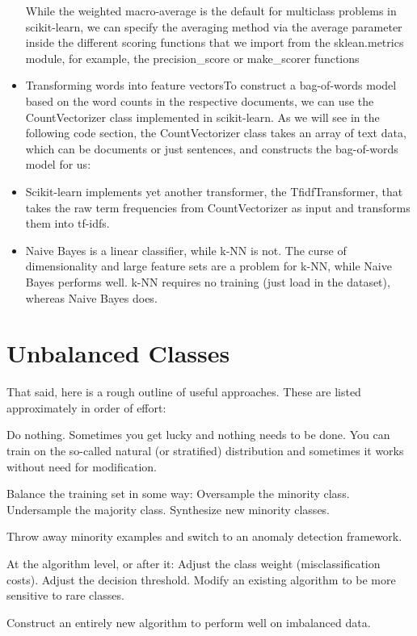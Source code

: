 \documentclass[]{book}
\theoremstyle{definition}
\theoremstyle{definition}
\theoremstyle{definition}
\theoremstyle{remark}
\begin{document}
\begin{itemize}
  While the weighted macro-average is the default for multiclass
  problems in scikit-learn, we can specify the averaging method via the
  average parameter inside the different scoring functions that we
  import from the sklean.metrics module, for example, the
  precision\_score or make\_scorer functions
\item
  Transforming words into feature vectorsTo construct a bag-of-words
  model based on the word counts in the respective documents, we can use
  the CountVectorizer class implemented in scikit-learn. As we will see
  in the following code section, the CountVectorizer class takes an
  array of text data, which can be documents or just sentences, and
  constructs the bag-of-words model for us:
\item
  Scikit-learn implements yet another transformer, the TfidfTransformer,
  that takes the raw term frequencies from CountVectorizer as input and
  transforms them into tf-idfs.
\item
  Naive Bayes is a linear classifier, while k-NN is not. The curse of
  dimensionality and large feature sets are a problem for k-NN, while
  Naive Bayes performs well. k-NN requires no training (just load in the
  dataset), whereas Naive Bayes does.
\end{itemize}

\section{Unbalanced Classes}\label{unbalanced-classes}

That said, here is a rough outline of useful approaches. These are
listed approximately in order of effort:

Do nothing. Sometimes you get lucky and nothing needs to be done. You
can train on the so-called natural (or stratified) distribution and
sometimes it works without need for modification.

Balance the training set in some way: Oversample the minority class.
Undersample the majority class. Synthesize new minority classes.

Throw away minority examples and switch to an anomaly detection
framework.

At the algorithm level, or after it: Adjust the class weight
(misclassification costs). Adjust the decision threshold. Modify an
existing algorithm to be more sensitive to rare classes.

Construct an entirely new algorithm to perform well on imbalanced data.
\end{document}
